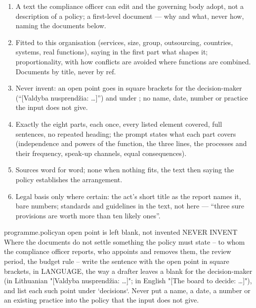 \begin{enumerate}[itemsep=1pt, topsep=3pt]
  \item A text the compliance officer can edit and the governing body adopt, not a description
    of a policy; a first-level document --- why and what, never how, naming the documents below.
  \item Fitted to this organisation (services, size, group, outsourcing, countries, systems,
    real functions), saying in the first part what shapes it; proportionality, with how conflicts
    are avoided where functions are combined. Documents by title, never by ref.
  \item Never invent: an open point goes in square brackets for the decision-maker
    (\enquote{[Valdyba nusprendžia: …]}) and under ; no name, date, number or
    practice the input does not give.
  \item Exactly the eight parts, each once, every listed element covered, full sentences, no
    repeated heading; the prompt states what each part covers (independence and powers of the
    function, the three lines, the processes and their frequency, speak-up channels, equal
    consequences).
  \item Sources word for word; none when nothing fits, the text then saying the policy
    establishes the arrangement.
  \item Legal basis only where certain: the act's short title as the report names it, bare
    numbers; standards and guidelines in the text, not here --- \enquote{three sure provisions
    are worth more than ten likely ones}.
\end{enumerate}

\par\nopagebreak
\begin{promptexcerpt}{programme.policy}{an open point is left blank, not invented}
NEVER INVENT
Where the documents do not settle something the policy must state – to whom the compliance officer reports, who appoints and removes them, the review period, the budget rule – write the sentence with the open point in square brackets, in {LANGUAGE}, the way a drafter leaves a blank for the decision-maker (in Lithuanian "[Valdyba nusprendžia: …]"; in English "[The board to decide: …]"), and list each such point under `decisions`. Never put a name, a date, a number or an existing practice into the policy that the input does not give.
\end{promptexcerpt}

